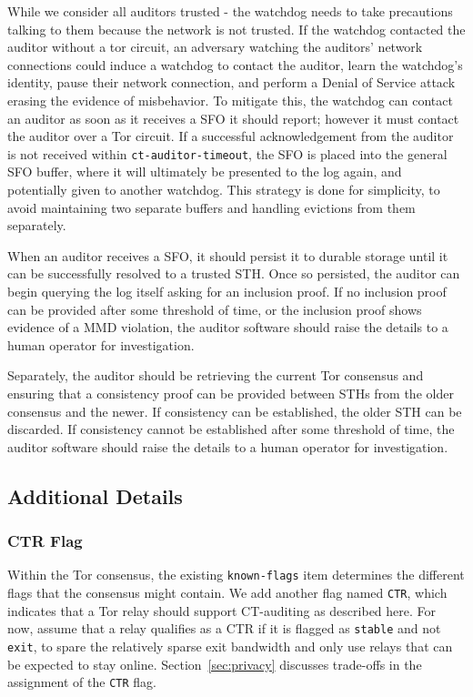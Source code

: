 While we consider all auditors trusted - the watchdog needs to take precautions talking to them because the network is not trusted. If the watchdog contacted the auditor without a tor circuit, an adversary watching the auditors' network connections could induce a watchdog to contact the auditor, learn the watchdog's identity, pause their network connection, and perform a Denial of Service attack erasing the evidence of misbehavior. To mitigate this, the watchdog can contact an auditor as soon as it receives a SFO it should report; however it must contact the auditor over a Tor circuit. If a successful acknowledgement from the auditor is not received within \texttt{ct-auditor-timeout}, the SFO is placed into the general SFO buffer, where it will ultimately be presented to the log again, and potentially given to another watchdog. This strategy is done for simplicity, to avoid maintaining two separate buffers and handling evictions from them separately.

When an auditor receives a SFO, it should persist it to durable storage until it can be successfully resolved to a trusted STH. Once so persisted, the auditor can begin querying the log itself asking for an inclusion proof. If no inclusion proof can be provided after some threshold of time, or the inclusion proof shows evidence of a MMD violation, the auditor software should raise the details to a human operator for investigation.

Separately, the auditor should be retrieving the current Tor consensus and ensuring that a consistency proof can be provided between STHs from the older consensus and the newer. If consistency can be established, the older STH can be discarded. If consistency cannot be established after some threshold of time, the auditor software should raise the details to a human operator for investigation.

\subsection{Additional Details} \label{sec:base:consensus}

\subsubsection{CTR Flag} \label{sec:base:consensus:ctr-flag}
Within the Tor consensus, the existing \texttt{known-flags} item determines the
different flags that the consensus might contain.  We add another flag named
\texttt{CTR}, which indicates that a Tor relay should support CT-auditing as
described here. For now, assume that a relay qualifies as a CTR if it is flagged
as \texttt{stable} and not \texttt{exit}, to spare the relatively sparse exit
bandwidth and only use relays that can be expected to stay online.
Section~\ref{sec:privacy} discusses trade-offs in the assignment of the
\texttt{CTR} flag.

